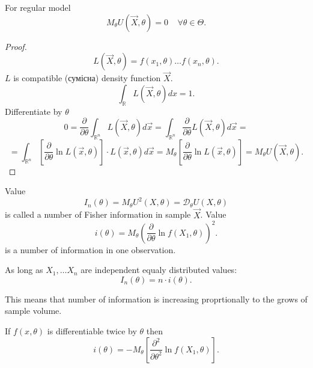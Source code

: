 \begin{corollary}
    For regular model \[
    M_{\theta} U(\vec{X}, \theta) = 0 \;\;\;\; \forall \theta \in \Theta
    .\] 
\end{corollary}
\begin{proof}
    \[
    L(\vec{X}, \theta) = f(x_1, \theta) \ldots f(x_n, \theta)
    .\] 
    $L$ is compatible (сумісна) density function $\vec{X}$.
    \[
    \int_{\mathbb{R}}^{} L(\vec{X}, \theta) dx = 1
    .\] 
    Differentiate by $\theta$
    \[
    0 = \frac{\partial }{\partial \theta}
    \int_{\mathbb{R}^{n}} L(\vec{X}, \theta) d \vec{x} =
    \int_{\mathbb{R}^{n}}^{} \frac{\partial}{\partial \theta}  L(\vec{X}, \theta) d\vec{x} = 
    \] 
    \[
    = \int_{\mathbb{R}^{n}}^{} \left[ \frac{\partial }{\partial \theta}
    \ln L(\vec{x}, \theta)  \right] \cdot L(\vec{x}, \theta) d\vec{x} =
    M_{\theta} \left[ \frac{\partial}{\partial \theta} \ln
    L(\vec{x}, \theta) \right] =
    M_{\theta} U(\vec{X}, \theta)
    .\] 
\end{proof}

\begin{definition}
    Value \[
    I_n (\theta) = M_{\theta} U^2(X, \theta) =
    \mathcal{D}_{\theta} U(X, \theta)
    \] is called a number of Fisher information in sample $\vec{X}$.
    Value
    \[
    i(\theta) = M_{\theta} \left( \frac{\partial }{\partial \theta}
    \ln f(X_1, \theta) \right) ^2
    .\] is a number of information in one observation.
\end{definition}

As long as $X_1, \ldots X_n $ are independent equaly distributed values:
\[
I_n(\theta) = n \cdot i(\theta)
.\] 

This means that number of information is increasing proprtionally
to the grows of sample volume.

\begin{corollary}
    If $f(x, \theta)$ is differentiable twice by $\theta$ then
     \[
         i(\theta) = - M_{\theta} \left[ \frac{\partial^2}{\partial \theta^2} \ln f(X_1, \theta) \right]
    .\] 
\end{corollary}

